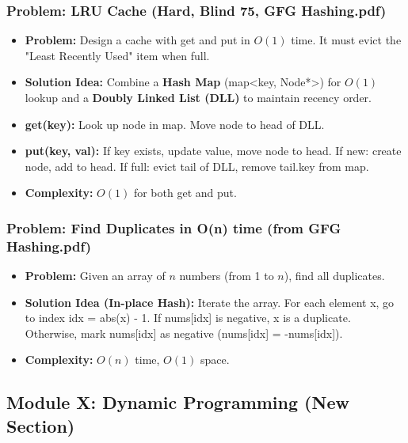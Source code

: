 \subsubsection{Problem: LRU Cache (Hard, Blind 75, GFG Hashing.pdf)}
\begin{itemize}
\item \textbf{Problem:} Design a cache with get and put in $O(1)$ time. It must evict the "Least Recently Used" item when full.
\item \textbf{Solution Idea:} Combine a \textbf{Hash Map} (map<key, Node*>) for $O(1)$ lookup and a \textbf{Doubly Linked List (DLL)} to maintain recency order.
\item \textbf{get(key):} Look up node in map. Move node to head of DLL.
\item \textbf{put(key, val):} If key exists, update value, move node to head. If new: create node, add to head. If full: evict tail of DLL, remove tail.key from map.
\item \textbf{Complexity:} $O(1)$ for both get and put.
\end{itemize}

\subsubsection{Problem: Find Duplicates in O(n) time (from GFG Hashing.pdf)}
\begin{itemize}
\item \textbf{Problem:} Given an array of $n$ numbers (from 1 to $n$), find all duplicates.
\item \textbf{Solution Idea (In-place Hash):} Iterate the array. For each element x, go to index idx = abs(x) - 1. If nums[idx] is negative, x is a duplicate. Otherwise, mark nums[idx] as negative (nums[idx] = -nums[idx]).
\item \textbf{Complexity:} $O(n)$ time, $O(1)$ space.
\end{itemize}

\subsection{Module X: Dynamic Programming (New Section)}

